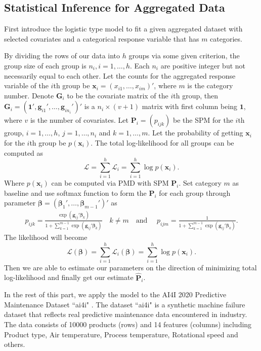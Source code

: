 \documentclass[12pt]{article}
\newcommand{\loglik}{\mathcal{L}}
\newcommand{\onevec}{{\boldsymbol{1}}}
\newcommand{\betavec}{{\boldsymbol{\beta}}}
\newcommand{\Pmat}{\mathbf{P}}
\newcommand{\Gmat}{\mathbf{G}}
\newcommand{\PMD}{\textrm{PMD}}
\newcommand{\wh}{\widehat}
\newcommand{\xvec}{\boldsymbol{x}}
\newcommand{\gvec}{\boldsymbol{g}}
\begin{document}
\subsection{Statistical Inference for Aggregated Data}\label{sec:model.est.inf}	
First introduce the logistic type model to fit a given aggregated dataset with selected covariates and a categorical response variable that has $m$ categories.

By dividing the rows of our data into $h$ groups via some given criterion, the group size of each group is $n_i,i=1,\dots,h$. Each $n_i$ are positive integer but not necessarily equal to each other. Let the counts for the aggregated response variable of the $i$th group be 
$\xvec_i = (x_{i1}, \dots,x_{im})'$, where $m$ is the category number. Denote $\Gmat_i$ to be the covariate matrix of the $i$th group, then $\Gmat_i = (\onevec', \gvec_{i 1}',\dots,\gvec_{i n_i}')'$ is a $n_i \times (v+1)$ matrix with first column being $\onevec$, where $v$ is the number of covariates. Let $\Pmat_i = (p_{ijk})$ be the SPM for the $i$th group, $i = 1, \dots, h$, $j = 1,\dots ,n_i$ and $k = 1,\dots, m$. Let the probability of getting $\xvec_i$ for the $i$th group be $p(\xvec_i)$. The total log-likelihood for all groups can be computed as
\begin{equation*}
\loglik = \sum_{i=1}^{h}\loglik_i = \sum_{i=1}^{h}\log p(\xvec_i).
\end{equation*}
Where $p(\xvec_i)$ can be computed via $\PMD$ with SPM $\Pmat_i$. Set category $m$ as baseline and use softmax function to form the $\Pmat_i$ for each group through parameter $\betavec = (\betavec_1', \dots, \betavec_{m-1}')'$ as
\begin{align*}
    p_{i j k} = \frac{\exp{\left(\gvec_{ij}' \betavec_{k}\right)}}{1 + \sum_{k=1}^{m-1}\exp{\left( \gvec_{ij}' \betavec_{k} \right)}}
    \quad k \neq m \quad \text{and } \quad
    p_{i j m} = \frac{1}{1 + \sum_{k=1}^{m-1}\exp{\left( \gvec_{ij}' \betavec_{k} \right)}}.
\end{align*}
The likelihood will become
\begin{equation*}
\loglik (\betavec) = \sum_{i=1}^{h}\loglik_i (\betavec)= \sum_{i=1}^{h}\log p(\xvec_i).
\end{equation*}
Then we are able to estimate our parameters on the direction of minimizing total log-likelihood and finally get our estimate $\wh{\Pmat}_i$.

In the rest of this part, we apply the model to the 
AI4I 2020 Predictive Maintenance Dataset ``ai4i"  \cite{Dua:2019}. The dataset ``ai4i" is a synthetic machine failure dataset that reflects real predictive maintenance data encountered in industry. The data consists of 10000 products (rows) and 14 features (columns) including Product type, Air temperature, Process temperature, Rotational speed and others.
\end{document}
